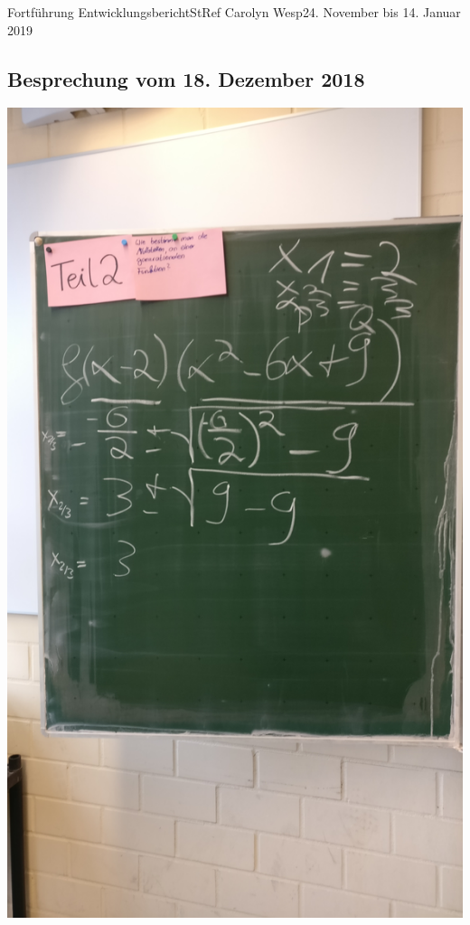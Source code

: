 \documentclass[oneside,openany,headings=optiontotoc,11pt,numbers=noenddot]{article}
\begin{document}
\begin{worksheet}{Fortführung Entwicklungsbericht}{StRef\grq{} Carolyn Wesp}{24. November bis 14. Januar 2019}
		\subsection*{Besprechung vom 18. Dezember 2018}
		\begin{minipage}{0.48\textwidth}
			\includegraphics[width=\textwidth]{../Faktorform_1.jpg}
		\end{minipage}
		\hfill
		\begin{minipage}{0.48\textwidth}

\end{minipage}
\end{worksheet}
\end{document}
